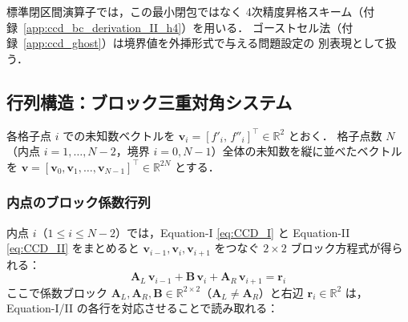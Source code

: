 標準閉区間演算子では，この最小閉包ではなく
4次精度昇格スキーム（付録~\ref{app:ccd_bc_derivation_II_h4}）を用いる．
ゴーストセル法（付録~\ref{app:ccd_ghost}）は境界値を外挿形式で与える問題設定の
別表現として扱う．


\subsection{行列構造：ブロック三重対角システム}
\label{sec:ccd_matrix}

各格子点 $i$ での未知数ベクトルを $\bm{v}_i = [f'_i,\, f''_i]^\top \in \mathbb{R}^2$ とおく．
格子点数 $N$（内点 $i = 1, \dots, N-2$，境界 $i=0, N-1$）全体の未知数を縦に並べたベクトルを
$\bm{v} = [\bm{v}_0, \bm{v}_1, \dots, \bm{v}_{N-1}]^\top \in \mathbb{R}^{2N}$ とする．

\subsubsection{内点のブロック係数行列}

内点 $i$（$1 \le i \le N-2$）では，Equation-I \eqref{eq:CCD_I} と Equation-II \eqref{eq:CCD_II} をまとめると
$\bm{v}_{i-1}, \bm{v}_i, \bm{v}_{i+1}$ をつなぐ $2\times2$ ブロック方程式が得られる：
\begin{equation}
  \mathbf{A}_L\,\bm{v}_{i-1} + \mathbf{B}\,\bm{v}_i + \mathbf{A}_R\,\bm{v}_{i+1} = \mathbf{r}_i
  \label{eq:ccd_block}
\end{equation}
ここで係数ブロック $\mathbf{A}_L, \mathbf{A}_R, \mathbf{B} \in \mathbb{R}^{2\times 2}$（$\mathbf{A}_L \neq \mathbf{A}_R$）と右辺 $\mathbf{r}_i \in \mathbb{R}^2$ は，
Equation-I/II の各行を対応させることで読み取れる：

